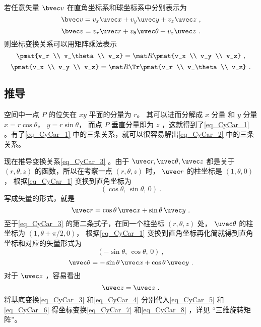 若任意矢量 $\bvec v$ 在直角坐标系和球坐标系中分别表示为
\begin{equation}\label{eq_CyCar_6}
\bvec v = v_x \uvec x + v_y \uvec y + v_z \uvec z~,
\end{equation}
\begin{equation}\label{eq_CyCar_5}
\bvec v = v_r \uvec r + v_\theta \uvec \theta + v_z \uvec z~.
\end{equation}
则坐标变换关系可以用矩阵乘法表示
\begin{equation}\label{eq_CyCar_8}
\pmat{v_r \\ v_\theta \\ v_z}
= \mat R \pmat{v_x \\ v_y \\ v_z}~,
\end{equation}
\begin{equation}\label{eq_CyCar_7}
\pmat{v_x \\ v_y \\ v_z}
= \mat R\Tr \pmat{v_r \\ v_\theta \\ v_z}~.
\end{equation}
\subsection{推导}
空间中一点 $P$ 的位矢在 $xy$ 平面的分量为 $r$。 其可以进而分解成 $x$ 分量 和 $y$ 分量  $x = r\cos \theta$，  $y = r\sin \theta$， 而点 $P$ 垂直分量即为 $z$ ，这就得到了\autoref{eq_CyCar_1} 。有了\autoref{eq_CyCar_1} 中的三条关系，就可以很容易解出\autoref{eq_CyCar_2} 中的三条关系。

现在推导变换关系\autoref{eq_CyCar_3} 。由于 $\uvec r,\uvec \theta ,\uvec z $ 都是关于 $(r, \theta, z)$ 的函数，所以在考察一点 $(r, \theta, z)$ 时， $\uvec r$ 的柱坐标是 $(1, \theta, 0)$，  根据\autoref{eq_CyCar_1} 变换到直角坐标为
\begin{equation}
(\cos \theta,\,\sin \theta,\,0)~.
\end{equation}
写成矢量的形式，就是
 \begin{equation}
\uvec r = \cos \theta \,\uvec x + \sin \theta \,\uvec y ~.
\end{equation}
至于\autoref{eq_CyCar_3} 的第二条式子，在同一个柱坐标 $(r,\theta ,z)$ 处， $\uvec \theta $ 的柱坐标为 $(1, \theta + \pi /2, 0)$， 根据\autoref{eq_CyCar_1} 变换到直角坐标再化简就得到直角坐标和对应的矢量形式为
\begin{equation}
(-\sin \theta ,\,\cos \theta , \,0)~,
\end{equation}
\begin{equation}
\uvec \theta  = -\sin \theta  \,\uvec x + \cos \theta \,\uvec y~.
\end{equation}
对于 $\uvec z$ ，容易看出
\begin{equation}
\uvec z = \uvec z~.
\end{equation}
将基底变换\autoref{eq_CyCar_3}  和\autoref{eq_CyCar_4} 分别代入\autoref{eq_CyCar_5}  和\autoref{eq_CyCar_6} 得坐标变换\autoref{eq_CyCar_7} 和\autoref{eq_CyCar_8} ，详见 “三维旋转矩阵”。

